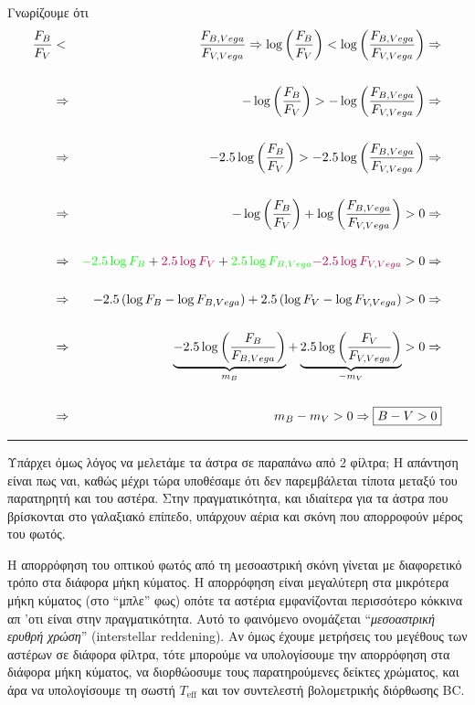 Γνωρίζουμε ότι 
\begin{eqnarray*}
\frac{F_B}{F_V} &<& \frac{F_{B,Vega}}{F_{V,Vega}} \Rightarrow \log \left( \frac{F_B}{F_V} \right) < \log \left( \frac{F_{B,Vega}}{F_{V,Vega}} \right) \Rightarrow \\\\\
&\Rightarrow & - \log \left( \frac{F_B}{F_V} \right) > - \log \left( \frac{F_{B,Vega}}{F_{V,Vega}} \right) \Rightarrow \\\\
&\Rightarrow & - 2.5 \log \left( \frac{F_B}{F_V} \right) > - 2.5 \log \left( \frac{F_{B,Vega}}{F_{V,Vega}} \right) \Rightarrow \\\\
&\Rightarrow & - \log \left( \frac{F_B}{F_V} \right) + \log \left( \frac{F_{B,Vega}}{F_{V,Vega}} \right) > 0 \Rightarrow \\\\
&\Rightarrow & {\color{green} -2.5 \log F_B} + {\color{purple} 2.5 \log F_V} + {\color{green} 2.5 \log F_{B,Vega}} {\color{purple} - 2.5 \log F_{V,Vega}} > 0 \Rightarrow \\\\
&\Rightarrow & -2.5 \left( \log F_B - \log F_{B,Vega} \right) + 2.5 \left( \log F_V - \log F_{V,Vega} \right) > 0 \Rightarrow \\\\
&\Rightarrow & \underbrace{-2.5 \log \left( \frac{F_B}{F_{B,Vega}} \right)}_{m_B} + \underbrace{2.5 \log \left( \frac{F_V}{F_{V,Vega}} \right)}_{- m_V} > 0 \Rightarrow \\\\
&\Rightarrow & m_B - m_V > 0 \Rightarrow \boxed{B - V > 0}
\end{eqnarray*}
\hrule 

Υπάρχει όμως λόγος να μελετάμε τα άστρα σε παραπάνω από 2 φίλτρα; Η απάντηση είναι πως ναι, καθώς μέχρι τώρα υποθέσαμε ότι δεν παρεμβάλεται τίποτα μεταξύ του παρατηρητή και του αστέρα. Στην πραγματικότητα, και ιδιαίτερα για τα άστρα που βρίσκονται στο γαλαξιακό επίπεδο, υπάρχουν αέρια και σκόνη που απορροφούν μέρος του φωτός.

Η απορρόφηση του οπτικού φωτός από τη μεσοαστρική σκόνη γίνεται με διαφορετικό τρόπο στα διάφορα μήκη κύματος. Η απορρόφηση είναι μεγαλύτερη στα μικρότερα μήκη κύματος (στο ``μπλε'' φως) οπότε τα αστέρια εμφανίζονται περισσότερο κόκκινα απ 'οτι είναι στην πραγματικότητα. Αυτό το φαινόμενο ονομάζεται ``\textit{μεσοαστρική ερυθρή χρώση}'' (interstellar reddening). Αν όμως έχουμε μετρήσεις του μεγέθους των αστέρων σε διάφορα φίλτρα, τότε μπορούμε να υπολογίσουμε την απορρόφηση στα διάφορα μήκη κύματος, να διορθώοσυμε τους παρατηρούμενες δείκτες χρώματος, και άρα να υπολογίσουμε τη σωστή $T_{\text{eff}}$ και τον συντελεστή βολομετρικής διόρθωσης BC.


